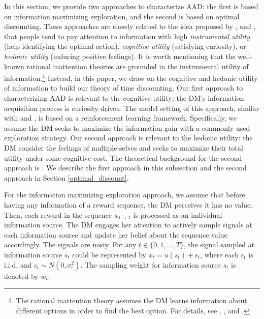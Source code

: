 \documentclass[
  12pt,
]{article}
\begin{document}
In this section, we provide two approaches to characterize AAD: the
first is based on information maximizing exploration, and the second is
based on optimal discounting. These approaches are closely related to
the idea proposed by \citet{gottlieb2012attention},
\citet{gottlieb2013information} and \citet{sharot2020people}, that
people tend to pay attention to information with high \emph{instrumental
utility} (help identifying the optimal action), \emph{cognitive utility}
(satisfying curiosity), or \emph{hedonic utility} (inducing positive
feelings). It is worth mentioning that the well-known rational
inattention theories are grounded in the instrumental utility of
information.\footnote{The rational inattention theory assumes the DM
  learns information about different options in order to find the best
  option. For details, see \citet{sims2003implications},
  \citet{matvejka2015rational}, and \citet{mackowiak2023rational}.}
Instead, in this paper, we draw on the cognitive and hedonic utility of
information to build our theory of time discounting. Our first approach
to characterizing AAD is relevant to the cognitive utility: the DM's
information acquisition process is curiosity-driven. The model setting
of this approach, similar with \citet{gottlieb2012attention} and
\citet{gottlieb2013information}, is based on a reinforcement learning
framework. Specifically, we assume the DM seeks to maximize the
information gain with a commonly-used exploration strategy. Our second
approach is relevant to the hedonic utility: the DM consider the
feelings of multiple selves and seeks to maximize their total utility
under some cognitive cost. The theoretical background for the second
approach is \citet{noor2022optimal,noor2024constrained}. We describe the
first approach in this subsection and the second approach in Section
\ref{optimal_discount}.

For the information maximizing exploration approach, we assume that
before having any information of a reward sequence, the DM perceives it
has no value. Then, each reward in the sequence \(s_{0\rightarrow T}\)
is processed as an individual information source. The DM engages her
attention to actively sample signals at each information source and
update her belief about the sequence value accordingly. The signals are
nosiy. For any \(t\in\{0,1,…,T\}\), the signal sampled at information
source \(s_t\) could be represented by \(x_t =u(s_t)+\epsilon_t\), where
each \(\epsilon_t\) is i.i.d. and
\(\epsilon_t \sim N(0,\sigma_\epsilon^2)\). The sampling weight for
information source \(s_t\) is denoted by \(w_t\).
\end{document}

